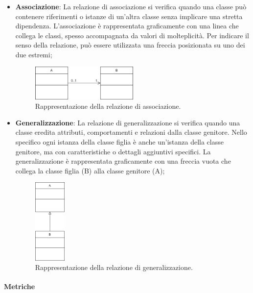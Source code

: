 \documentclass[10pt]{article}
\begin{document}
\begin{justify}
\begin{itemize}
            \item \textbf{Associazione}: La relazione di associazione si verifica quando una classe può contenere riferimenti o istanze di un’altra classe senza implicare una stretta dipendenza. L'associazione è rappresentata graficamente con una linea che collega le classi, spesso accompagnata da valori di molteplicità. Per indicare il senso della relazione, può essere utilizzata una freccia posizionata su uno dei due estremi;
            \begin{figure}[H]
            \centering
            \includegraphics[width=0.5\textwidth]{AssociazioneClasse.png}
            \caption{Rappresentazione della relazione di associazione.}
            \end{figure}
        
            \item \textbf{Generalizzazione}: La relazione di generalizzazione si verifica quando una classe eredita attributi, comportamenti e relazioni dalla classe genitore. Nello specifico ogni istanza della classe figlia è anche un'istanza della classe genitore, ma con caratteristiche o dettagli aggiuntivi specifici. La generalizzazione è rappresentata graficamente con una freccia vuota che collega la classe figlia (B) alla classe genitore (A);
            \begin{figure}[H]
            \centering
            \includegraphics[width=0.15\textwidth]{GeneralizzazioneClasse.png}
            \caption{Rappresentazione della relazione di generalizzazione.}
            \end{figure}
        \end{itemize}
    
        \paragraph{Metriche}


\end{justify}
\end{document}
